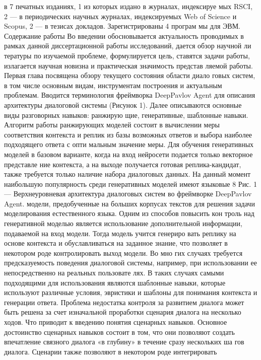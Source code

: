 в 7 печатных изданиях, 1 из которых издано в журналах, индексируе
мых RSCI, 2 — в периодических научных журналах, индексируемых Web
of Science и Scopus, 2 — в тезисах докладов. Зарегистрированы 4 програм
мы для ЭВМ.
Содержание работы
Во введении обосновывается актуальность проводимых в рамках
данной диссертационной работы исследований, дается обзор научной ли
тературы по изучаемой проблеме, формулируется цель, ставятся задачи
работы, излагается научная новизна и практическая значимость представ
ляемой работы.
Первая глава посвящена обзору текущего состояния области диало
говых систем, в том числе основным видам, инструментам построения и
актуальным проблемам. Вводится терминология фреймворка DeepPavlov
Agent для описания архитектуры диалоговой системы (Рисунок 1).
Далее описываются основные виды разговорных навыков: ранжирую
щие, генеративные, шаблонные навыки. Алгоритм работы ранжирующих
моделей состоит в вычислении меры соответствия контекста и реплик из
базы возможных ответов и выбора наиболее подходящего ответа с опти
мальным значение меры. Для обучения генеративных моделей в базовом
варианте, когда на вход нейросети подается только векторное представле
ние контекста, а на выходе получается готовая реплика-кандидат, также
требуется только наличие набора диалоговых данных. На данный момент
наибольшую популярность среди генеративных моделей имеют языковые
8
Рис. 1 — Верхнеуровневая архитектура диалоговых систем во фреймворке
DeepPavlov Agent.
модели, предобученные на больших корпусах текстов для решения задачи
моделирования естественного языка. Одним из способов повысить кон
троль над генеративной моделью является использование дополнительной
информации, подаваемой на вход модели. Тогда модель учится генериро
вать реплику на основе контекста и обуславливаться на заданное знание,
что позволяет в некотором роде контролировать выход модели. Во мно
гих случаях требуется предсказуемость поведения диалоговой системы,
например, при использовании ее непосредственно на реальных пользовате
лях. В таких случаях самыми подходящими для использования являются
шаблонные навыки, которые используют различные условия, эвристики и
шаблоны для понимания контекста и генерации ответа.
Проблема недостатка контроля за развитием диалога может быть
решена за счет изначальной проработки сценария диалога на несколько
ходов. Что приводит к введению понятия сценарных навыков. Основное
достоинство сценарных навыков состоит в том, что они позволяют создать
впечатление связного диалога «в глубину» в течение сразу нескольких ша
гов диалога. Сценарии также позволяют в некотором роде интегрировать
